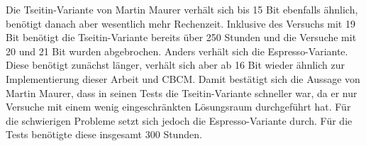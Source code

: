 Die Tseitin-Variante von Martin Maurer verhält sich bis 15 Bit ebenfalls ähnlich, benötigt danach aber wesentlich mehr Rechenzeit.
Inklusive des Versuchs mit 19 Bit benötigt die Tseitin-Variante bereits über 250 Stunden und die Versuche mit 20 und 21 Bit wurden
abgebrochen. Anders verhält sich die Espresso-Variante. Diese benötigt zunächst länger, verhält sich aber ab 16 Bit wieder ähnlich
zur Implementierung dieser Arbeit und CBCM. Damit bestätigt sich die Aussage von Martin Maurer, dass in seinen Tests die Tseitin-Variante
schneller war, da er nur Versuche mit einem wenig eingeschränkten Lösungsraum durchgeführt hat. Für die schwierigen Probleme
setzt sich jedoch die Espresso-Variante durch. Für die Tests benötigte diese insgesamt 300 Stunden.